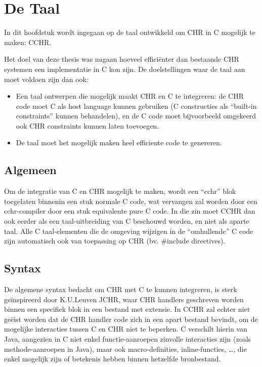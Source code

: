 \chapter{De Taal} \label{chap:taal}

In dit hoofdstuk wordt ingegaan op de taal ontwikkeld om CHR in C mogelijk te maken: CCHR.

Het doel van deze thesis was nagaan hoeveel effici\"enter dan bestaande CHR systemen een implementatie
in C kon zijn. De doelstellingen waar de taal aan moet voldoen zijn dan ook: \begin{itemize}
  \item Een taal ontwerpen die mogelijk maakt CHR en C te integreren: de CHR code moet C
        als host language kunnen gebruiken (C constructies als ``built-in constraints'' kunnen
	behandelen), en de C code moet bijvoorbeeld omgekeerd ook CHR constraints kunnen laten toevoegen.
  \item De taal moet het mogelijk maken heel efficiente code te genereren.
\end{itemize}

\section{Algemeen} \label{sec:taal-gen}

Om de integratie van C en CHR mogelijk te maken, wordt een ``cchr'' blok toegelaten binnenin een stuk normale C code, wat vervangen zal worden door een cchr-compiler door een stuk equivalente pure C code. In die zin moet CCHR dan ook eerder als een taal-uitbreiding van C beschouwd worden, en niet als aparte taal. Alle C taal-elementen die de omgeving wijzigen in de ``omhullende'' C code zijn automatisch ook van toepassing op CHR (bv. \#include directives). 

\section{Syntax} \label{sec:taal-syn}

De algemene syntax bedacht om CHR met C te kunnen integreren, is sterk ge\"inspireerd door K.U.Leuven JCHR, waar CHR handlers geschreven worden binnen een specifiek blok in een bestand met  extensie. In CCHR zal echter niet ge\"eist worden dat de CHR handler code zich in een apart bestand bevindt, om de mogelijke interacties tussen C en CHR niet te beperken. C verschilt hierin van Java, aangezien in C niet enkel functie-aanroepen zinvolle interacties zijn (zoals methode-aanroepen in Java), maar ook macro-definities, inline-functies, \ldots, die enkel mogelijk zijn of betekenis hebben binnen hetzelfde bronbestand.

